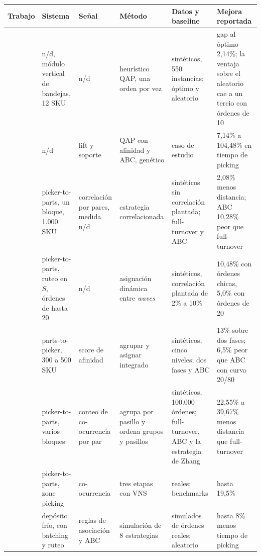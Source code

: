 \begin{table}[tp]
    \centering
    \scriptsize
    \renewcommand{\arraystretch}{1.05}
    \begin{tabularx}{\textwidth}{|L|L|L|L|L|L|}
        \hline
        \textbf{Trabajo} & \textbf{Sistema} & \textbf{Señal} & \textbf{Método} & \textbf{Datos y baseline} & \textbf{Mejora reportada} \\
        \hline
        \citet{mantel2007order} & n/d, módulo vertical de bandejas, 12 SKU & n/d & heurístico QAP, una orden por vez & sintéticos, 550 instancias; óptimo y aleatorio & gap al óptimo 2,14\%; la ventaja sobre el aleatorio cae a un tercio con órdenes de 10 \\
        \hline
        \citet{li2015dynamic} & n/d & lift y soporte & QAP con afinidad y ABC, genético & caso de estudio & 7,14\% a 104,48\% en tiempo de picking \\
        \hline
        \citet{zhang2016correlated} & picker-to-parts, un bloque, 1.000 SKU & correlación por pares, medida n/d & estrategia correlacionada & sintéticos sin correlación plantada; full-turnover y ABC & 2,08\% menos distancia; ABC 10,28\% peor que full-turnover \\
        \hline
        \citet{xu2020dynamic} & picker-to-parts, ruteo en $S$, órdenes de hasta 20 & n/d & asignación dinámica entre \emph{waves} & sintéticos, correlación plantada de 2\% a 10\% & 10,48\% con órdenes chicas, 5,0\% con órdenes de 20 \\
        \hline
        \citet{mirzaei2021integrated} & parts-to-picker, 300 a 500 SKU & score de afinidad & agrupar y asignar integrado & sintéticos, cinco niveles; dos fases y ABC & 13\% sobre dos fases; 6,5\% peor que ABC con curva 20/80 \\
        \hline
        \citet{islam2024heuristic} & picker-to-parts, varios bloques & conteo de co-ocurrencia por par & agrupa por pasillo y ordena grupos y pasillos & sintéticos, 100.000 órdenes; full-turnover, ABC y la estrategia de Zhang & 22,55\% a 39,67\% menos distancia que full-turnover \\
        \hline
        \citet{debold2025storage} & picker-to-parts, zone picking & co-ocurrencia & tres etapas con VNS & reales; benchmarks & hasta 19,5\% \\
        \hline
        \citet{benaglia2024cold} & depósito frío, con batching y ruteo & reglas de asociación y ABC & simulación de 8 estrategias & simulados de órdenes reales; aleatorio & hasta 8\% menos tiempo de picking \\

\end{tabularx}
\end{table}

